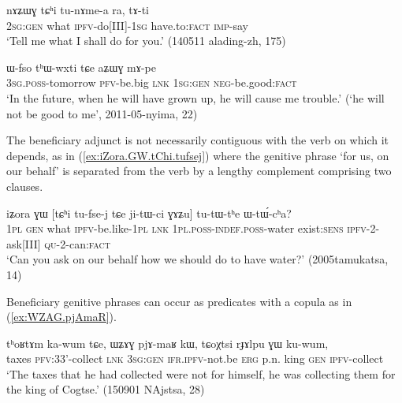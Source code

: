 \begin{exe}
\ex \label{ex:tChi.tunAmea}
\gll nɤʑɯɣ tɕʰi tu-nɤme-a ra, tɤ-ti  \\
\textsc{2sg}:\textsc{gen} what \textsc{ipfv}-do[III]-\textsc{1sg} have.to:\textsc{fact} \textsc{imp}-say \\
\glt `Tell me what I shall do for you.' (140511 alading-zh, 175)
\end{exe}

\begin{exe}
\ex \label{ex:aZWG.mApe}
\gll  ɯ-fso tʰɯ-wxti tɕe aʑɯɣ mɤ-pe \\ 
\textsc{3sg}.\textsc{poss}-tomorrow \textsc{pfv}-be.big \textsc{lnk} \textsc{1sg}:\textsc{gen} \textsc{neg}-be.good:\textsc{fact} \\
\glt `In the future, when he will have grown up, he will cause me trouble.' (`he will not be good to me', 2011-05-nyima, 22)
\end{exe}

The beneficiary adjunct is not necessarily contiguous with the verb on which it depends, as in (\ref{ex:iZora.GW.tChi.tufsej}) where the genitive phrase  `for us, on our behalf'  is separated from the verb  by a lengthy complement comprising two clauses.

\begin{exe}
\ex \label{ex:iZora.GW.tChi.tufsej}
\gll  iʑora ɣɯ [tɕʰi tu-fse-j tɕe ji-tɯ-ci ɣɤʑu] tu-tɯ-tʰe ɯ-tɯ́-cʰa? \\
\textsc{1pl} \textsc{gen} what \textsc{ipfv}-be.like-\textsc{1pl} \textsc{lnk} \textsc{1pl}.\textsc{poss}-\textsc{indef}.\textsc{poss}-water exist:\textsc{sens} \textsc{ipfv}-2-ask[III] \textsc{qu}-2-can:\textsc{fact} \\
\glt `Can you ask on our behalf how we should do to have water?' (2005tamukatsa, 14)
\end{exe}

Beneficiary genitive phrases can occur as predicates with a copula as  in (\ref{ex:WZAG.pjAmaR}).

 \begin{exe}
\ex \label{ex:WZAG.pjAmaR}
\gll   tʰoʁtɤm ka-wum tɕe, ɯʑɤɣ pjɤ-maʁ kɯ, tɕoχtsi rɟɤlpu ɣɯ ku-wum,  \\
taxes \textsc{pfv}:3\fl{}3'-collect \textsc{lnk} \textsc{3sg}:\textsc{gen} \textsc{ifr}.\textsc{ipfv}-not.be \textsc{erg} p.n. king \textsc{gen} \textsc{ipfv}-collect \\
\glt `The taxes that he had collected were not for himself, he was collecting them for the king of Cogtse.' (150901 NAjstsa, 28)
\end{exe}

